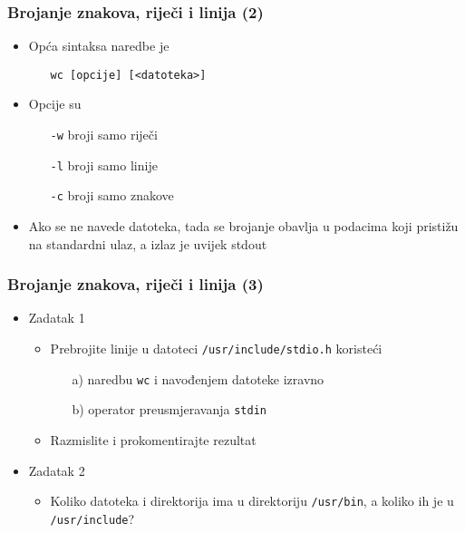 \documentclass{beamer}
\newcommand{\shell}[1]{\texttt{#1}}
\begin{document}
\begin{frame}[t]
\frametitle{Brojanje znakova, riječi i linija (2)}
\begin{itemize}
  \item Opća sintaksa naredbe je
  \begin{itemize}
    \item[] \shell{wc [opcije] [<datoteka>]}
  \end{itemize}
  \item Opcije su
  \begin{itemize}
    \item[] \shell{-w} broji samo riječi
    \item[] \shell{-l} broji samo linije
    \item[] \shell{-c} broji samo znakove
  \end{itemize}
  \item Ako se ne navede datoteka, tada se brojanje obavlja u podacima koji
        pristižu na standardni ulaz, a izlaz je uvijek stdout
\end{itemize}
\end{frame}

\begin{frame}[t]
\frametitle{Brojanje znakova, riječi i linija (3)}
\begin{itemize}
  \item Zadatak 1
  \begin{itemize}
	\item Prebrojite linije u datoteci \shell{/usr/include/stdio.h} koristeći
	\begin{itemize}
		\item[a)] naredbu \shell{wc} i navođenjem datoteke izravno
		\item[b)] operator preusmjeravanja \shell{stdin}
	\end{itemize}
	\item Razmislite i prokomentirajte rezultat
  \end{itemize}
  \item[]
  \item Zadatak 2
  \begin{itemize}
    \item Koliko datoteka i direktorija ima u direktoriju \shell{/usr/bin},
          a koliko ih je u \shell{/usr/include}?
  \end{itemize}
\end{itemize}
\end{frame}
\end{document}
